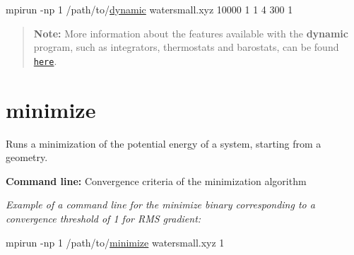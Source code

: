 \begin{DoxyCode}
mpirun -np 1 /path/to/\hyperlink{dynamic_8f90_a242c646ad028ae81e8a4bed2193eae5d}{dynamic} watersmall.xyz 10000 1 1 4 300 1
\end{DoxyCode}


\begin{quotation}
{\bfseries Note\-:} More information about the features available with the {\bfseries dynamic} program, such as integrators, thermostats and barostats, can be found \href{md_dynamic_doxygen.html}{\tt here}.

\end{quotation}
\hypertarget{md_binaries_doxygen_program_minimize}{}\section{minimize}\label{md_binaries_doxygen_program_minimize}
Runs a minimization of the potential energy of a system, starting from a geometry.
\begin{DoxyItemize}
\item {\bfseries Command line\-:} Convergence criteria of the minimization algorithm
\end{DoxyItemize}

{\itshape Example of a command line for the minimize binary corresponding to a convergence threshold of 1 for R\-M\-S gradient\-:}


\begin{DoxyCode}
mpirun -np 1 /path/to/\hyperlink{minimize_8f90_a0ea869a84e4dbfc9951ec265abef5b8d}{minimize} watersmall.xyz 1
\end{DoxyCode}


